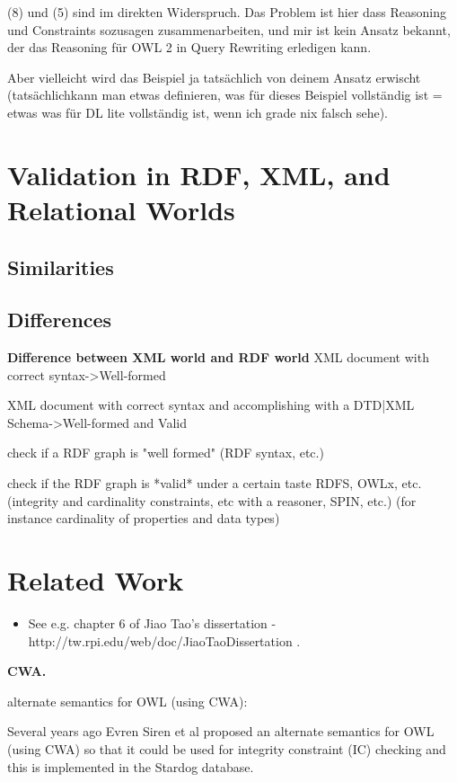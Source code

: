 \documentclass{llncs}
\begin{document}
(8) und (5) sind im direkten Widerspruch. Das Problem ist hier dass
Reasoning und Constraints sozusagen zusammenarbeiten, und mir ist kein
Ansatz bekannt, der das Reasoning für OWL 2 in Query Rewriting erledigen
kann.

Aber vielleicht wird das Beispiel ja tatsächlich von deinem Ansatz
erwischt (tatsächlichkann man etwas definieren, was für dieses Beispiel
vollständig ist = etwas was für DL lite vollständig ist, wenn ich grade
nix falsch sehe).

\section{Validation in RDF, XML, and Relational Worlds}

\subsection{Similarities}



\subsection{Differences}

\textbf{Difference between XML world and RDF world}
XML document with correct syntax->Well-formed

XML document with correct syntax and accomplishing with a DTD|XML Schema->Well-formed and Valid

check if a RDF graph is "well formed" (RDF syntax, etc.)

check if the RDF graph is *valid* under a certain taste RDFS, OWLx, etc. (integrity and cardinality constraints, etc with a reasoner, SPIN, etc.) (for instance cardinality of properties and data types)

\section{Related Work}

\begin{itemize}
	\item See e.g. chapter 6 of Jiao Tao's dissertation - http://tw.rpi.edu/web/doc/JiaoTaoDissertation .
\end{itemize}

\textbf{CWA.}

alternate semantics for OWL (using CWA):

Several years ago Evren Siren et al proposed an alternate semantics for OWL (using CWA) so that it could be used for integrity constraint (IC) checking and this is implemented in the Stardog database. 
\end{document}
